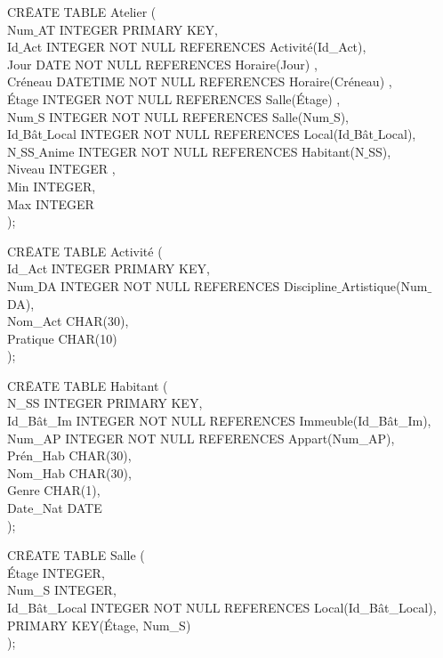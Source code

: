 \documentclass[a4paper,10.5pt]{report}
\begin{document}
		\begin{tabbing}
			CR\=EATE TABLE Atelier (\\
			\> Num$\_$AT INTEGER PRIMARY KEY,\\
			\> Id$\_$Act INTEGER NOT NULL REFERENCES Activité(Id\_Act),\\
			\> Jour DATE NOT NULL REFERENCES Horaire(Jour) ,\\
			\> Créneau DATETIME NOT NULL REFERENCES Horaire(Créneau) ,\\
			\> Étage INTEGER NOT NULL REFERENCES Salle(Étage) ,\\
			\> Num$\_$S INTEGER NOT NULL REFERENCES Salle(Num$\_$S),\\
			\> Id$\_$Bât$\_$Local INTEGER NOT NULL REFERENCES Local(Id$\_$Bât$\_$Local),\\
			\> N$\_$SS$\_$Anime  INTEGER NOT NULL REFERENCES Habitant(N$\_$SS),\\
			\> Niveau INTEGER ,\\
			\> Min INTEGER,\\
			\> Max INTEGER\\);
		\end{tabbing}

		\begin{tabbing}
			CR\=EATE TABLE Activité (\\
			\> Id\_Act INTEGER PRIMARY KEY,\\
			\> Num$\_$DA INTEGER NOT NULL REFERENCES Discipline$\_$Artistique(Num$\_$DA),\\
			\> Nom\_Act CHAR(30),\\
			\> Pratique CHAR(10)\\);
		\end{tabbing}

		\begin{tabbing}
			CR\=EATE TABLE Habitant (\\
			\> N\_SS INTEGER PRIMARY KEY,\\
			\> Id\_Bât\_Im INTEGER NOT NULL REFERENCES Immeuble(Id\_Bât\_Im),\\
			\> Num\_AP INTEGER NOT NULL REFERENCES Appart(Num\_AP),\\
			\> Prén\_Hab CHAR(30),\\
			\> Nom\_Hab CHAR(30),\\
			\> Genre CHAR(1),\\
			\> Date\_Nat DATE\\);
		\end{tabbing}

		\begin{tabbing}
			CR\=EATE TABLE Salle (\\
			\> Étage INTEGER,\\
			\> Num\_S INTEGER,\\
			\> Id\_Bât\_Local INTEGER NOT NULL REFERENCES Local(Id\_Bât\_Local),\\
			\> PRIMARY KEY(Étage, Num\_S)\\);
		\end{tabbing}
\end{document}
